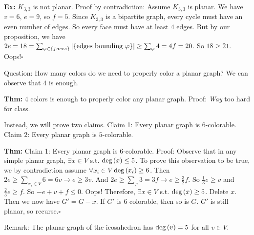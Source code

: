 \documentclass[10pt,letterpaper]{article}
\newcommand{\n}{\hfill\break}
\newcommand{\thm}[1]{\par\noindent\settowidth{\hangindent}{\textbf{Thm: }}\textbf{Thm: }#1\n}
\newcommand{\ex}[1]{\par\noindent\settowidth{\hangindent}{\textbf{Ex: }}\textbf{Ex: }#1\n}
\newcommand{\proven}{\;$\square$\n}
\newcommand{\ptxt}[1]{\textrm{\textnormal{#1}}}
\newcommand{\card}[1]{\left|#1\right|}
\newcommand{\set}[1]{\left\{#1\right\}}
\renewcommand{\deg}[1]{\ptxt{deg}\left(#1\right)}
\newcommand{\st}{s.t.}
\begin{document}
\ex{$K_{3,3}$ is not planar.\n
Proof by contradiction: Assume $K_{3,3}$ is planar. We have $v=6$, $e=9$, so $f=5$. Since $K_{3,3}$ is a bipartite graph, every cycle must have an even number of edges. So every face must have at least $4$ edges.\n
But by our proposition, we have $2e=18=\sum_{\varphi\in\set{faces}}\card{\set{\ptxt{edges bounding }\varphi}}\ge\sum_{\varphi}4=4f=20$. So $18\ge{}21$. Oops!\proven}

\par\noindent Question: How many colors do we need to properly color a planar graph? We can observe that $4$ is enough.\n

\thm{$4$ colors is enough to properly color any planar graph.\n
Proof: \textit{Way} too hard for class.}

\par\noindent Instead, we will prove two claims.\n
Claim 1: Every planar graph is $6$-colorable.\n
Claim 2: Every planar graph is $5$-colorable.\n

\thm{Claim 1: Every planar graph is $6$-colorable.\n
Proof: Observe that in any simple planar graph, $\exists{}x\in{}V$ \st{} $\deg{x}\le{}5$. To prove this observation to be true, we by contradiction assume $\forall{}x_{i}\in{}V$ $\deg{x_{i}}\ge{}6$.\n
Then $2e\ge\sum_{x_{i}\in{}V}6=6v\to{}e\ge{}3v$.\n
And $2e\ge\sum_{\varphi}3=3f\to{}e\ge\frac{3}{2}f$.\n
So $\frac{1}{3}e\ge{}v$ and $\frac{2}{3}e\ge{}f$. So $-e+v+f\le{}0$. Oops!\n
Therefore, $\exists{}x\in{}V$ \st{} $\deg{x}\ge{}5$.\n
\n
Delete $x$. Then we now have $G'=G-x$. If $G'$ is $6$ colorable, then so is $G$. $G'$ is still planar, so recurse.\proven}

\par\noindent Remark: The planar graph of the icosahedron has $\deg{v}=5$ for all $v\in{}V$.\n
\end{document}
